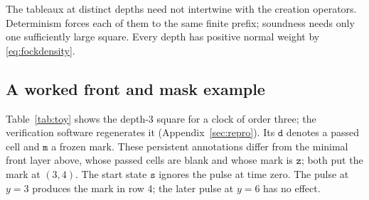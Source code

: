 The tableaux at distinct depths need not intertwine with the creation operators. Determinism forces each of them to the same finite prefix; soundness needs only one sufficiently large square. Every depth has positive normal weight by \eqref{eq:fockdensity}.

\subsection{A worked front and mask example}\label{sec:toy}
Table~\ref{tab:toy} shows the depth-$3$ square for a clock of order three; the verification software regenerates it (Appendix~\ref{sec:repro}). Its $\mathtt d$ denotes a passed cell and $\mathtt m$ a frozen mark. These persistent annotations differ from the minimal front layer above, whose passed cells are blank and whose mark is $\mathtt z$; both put the mark at $(3,4)$. The start state $\mathtt s$ ignores the pulse at time zero. The pulse at $y=3$ produces the mark in row 4; the later pulse at $y=6$ has no effect.

